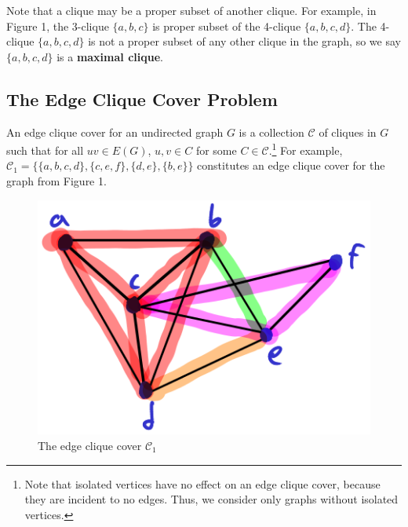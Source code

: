 \documentclass[12pt]{article}
\begin{document}
    Note that a clique may be a proper subset of another clique.
    For example, in Figure 1, the 3-clique $\{a, b, c\}$ is proper subset of the 4-clique $\{a, b, c, d\}$.
    The 4-clique $\{a, b, c, d\}$ is not a proper subset of any other clique in the graph, so we say $\{a, b, c, d\}$ is a \textbf{maximal clique}.
   
\subsection*{The Edge Clique Cover Problem}

    An edge clique cover for an undirected graph $G$ is a collection $\mathcal C$ of cliques in $G$ such that for all $uv \in E(G)$, $u, v \in C$ for some $C \in \mathcal C$.\footnote{Note that isolated vertices have no effect on an edge clique cover, because they are incident to no edges. Thus, we consider only graphs without isolated vertices.}
    For example, $\mathcal C_1 = \{\{a, b, c, d\}, \{c, e, f\}, \{d, e\}, \{b, e\}\}$ constitutes an edge clique cover for the graph from Figure 1.
    \begin{figure}[hbt!]
    \begin{center}
        \includegraphics[scale=.6]{fig2.png}

        \caption{The edge clique cover $\mathcal C_1$}
    \end{center}
    \end{figure}
    
\end{document}
